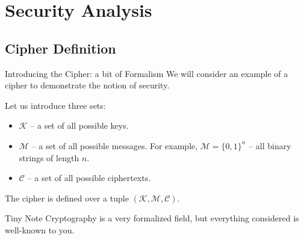 \documentclass{beamer}
\begin{document}
    \section{Security Analysis}

    \subsection{Cipher Definition}

    \begin{frame}{Introducing the Cipher: a bit of Formalism}
        We will consider an example of a cipher to demonstrate the notion of security.

        Let us introduce three sets:
        \begin{itemize}
            \item $\mathcal{K}$ -- a set of all possible keys.
            \item $\mathcal{M}$ -- a set of all possible messages. For example, $\mathcal{M} = \{0,1\}^n$ -- all binary strings of length $n$.
            \item $\mathcal{C}$ -- a set of all possible ciphertexts.
        \end{itemize}

        The cipher is defined over a tuple $(\mathcal{K}, \mathcal{M}, \mathcal{C})$.

        \begin{block}{Tiny Note}
            Cryptography is a very formalized field, but everything considered is well-known to you.
        \end{block}
    \end{frame}
\end{document}
